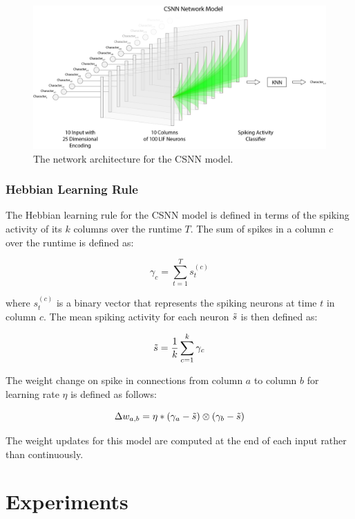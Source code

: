 \documentclass{article}
\begin{document}
\begin{figure}[H]
    \centering
    \includegraphics[width=0.9\linewidth]{../diagrams/csnn.png}
    \caption{The network architecture for the CSNN model.}
    \label{fig:csnn-network-diagram}
\end{figure}

\subsubsection*{Hebbian Learning Rule}
The Hebbian learning rule for the CSNN model is defined in terms of the spiking activity of its $k$ columns over the runtime $T$. The sum of spikes in a column $c$ over the runtime is defined as:

\begin{equation}
    \gamma_c = \sum_{t = 1}^{T}{s_t^{\left(c\right)}}
\end{equation}

where $s_t^{\left(c\right)}$ is a binary vector that represents the spiking neurons at time $t$ in column $c$. The mean spiking activity for each neuron $\Tilde{s}$ is then defined as:

\begin{equation}
    \Tilde{s} = \frac{1}{k} \sum_{c = 1}^{k}{\gamma_c}
    \label{eq:mean_spikes_equation}
\end{equation}

The weight change on spike in connections from column $a$ to column $b$ for learning rate $\eta$ is defined as follows:

\begin{equation}
    \Delta w_{a,b} = \eta * (\gamma_a - \Tilde{s})\otimes(\gamma_b - \Tilde{s})
\end{equation}

The weight updates for this model are computed at the end of each input rather than continuously.

\section*{Experiments}
\end{document}
